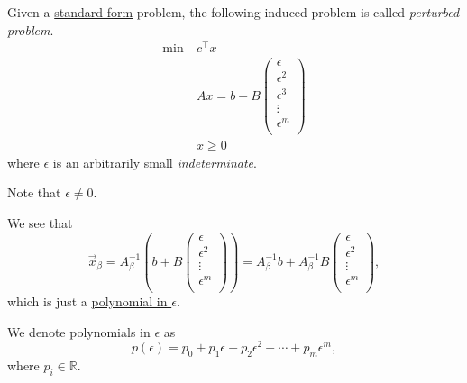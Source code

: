 \begin{definition}\label{def:perturbed-problem}
	Given a \hyperref[def:standard-form]{standard form} problem, the following induced problem is called \emph{perturbed problem}.
	\[
		\begin{aligned}
			\min~ & c^{\top} x               \\
			      & Ax = b + B\begin{pmatrix}
				                  \epsilon   \\
				                  \epsilon^2 \\
				                  \epsilon^3 \\
				                  \vdots     \\
				                  \epsilon^m \\
			                  \end{pmatrix} \\
			      & x\geq 0
		\end{aligned}
	\]
	where \(\epsilon \) is an arbitrarily small \emph{indeterminate}.
\end{definition}

\begin{remark}
	Note that \(\epsilon \neq 0\).
\end{remark}

\begin{note}
	We see that
	\[
		\vec{x}_{\beta} = A^{-1}_{\beta}\left(b + B\begin{pmatrix}
				\epsilon   \\
				\epsilon^2 \\
				\vdots     \\
				\epsilon^m \\
			\end{pmatrix}\right) = A^{-1}_{\beta}b + A^{-1}_{\beta}B\begin{pmatrix}
			\epsilon   \\
			\epsilon^2 \\
			\vdots     \\
			\epsilon^m \\
		\end{pmatrix},
	\]
	which is just a \hyperref[def:polynomial-in-epsilon]{polynomial in \(\epsilon\)}.
\end{note}

\begin{definition}\label{def:polynomial-in-epsilon}
	We denote polynomials in \(\epsilon\) as
	\[
		p(\epsilon) = p_0 + p_1\epsilon + p_2 \epsilon^2 + \cdots + p_{m}\epsilon^m,
	\]
	where \(p_i\in\mathbb{R}\).
\end{definition}


